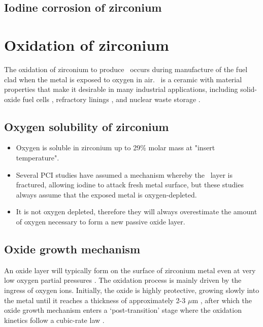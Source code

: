 \subsection{Iodine corrosion of zirconium}

\section{Oxidation of zirconium}

The oxidation of zirconium to produce \zirconia\ occurs during manufacture of the fuel clad when the metal is exposed to oxygen in air. \zirconia\ is a ceramic with material properties that make it desirable in many industrial applications, including solid-oxide fuel cells \cite{radford1979zirconia}, refractory linings \cite{whittemore1952fused}, and nuclear waste storage \cite{wang2012ceramics}.

\subsection{Oxygen solubility of zirconium}

\begin{itemize}
\item Oxygen is soluble in zirconium up to 29\% molar mass at "insert temperature".
\item Several PCI studies have assumed a mechanism whereby the \zirconia\ layer is fractured, allowing iodine to attack fresh metal surface, but these studies always assume that the exposed metal is oxygen-depleted.
\item It is not oxygen depleted, therefore they will always overestimate the amount of oxygen necessary to form a new passive oxide layer.
\end{itemize}

\subsection{Oxide growth mechanism}

An oxide layer will typically form on the surface of zirconium metal even at very low oxygen partial pressures \cite{causey2005review}. The oxidation process is mainly driven by the ingress of oxygen ions. Initially, the oxide is highly protective, growing slowly into the metal until it reaches a thickness of approximately 2-3 $\mu$m \cite{garzarolli1991oxide,dawson1968kinetics}, after which the oxide growth mechanism enters a `post-transition' stage where the oxidation kinetics follow a cubic-rate law  \cite{porte1960oxidation}.

